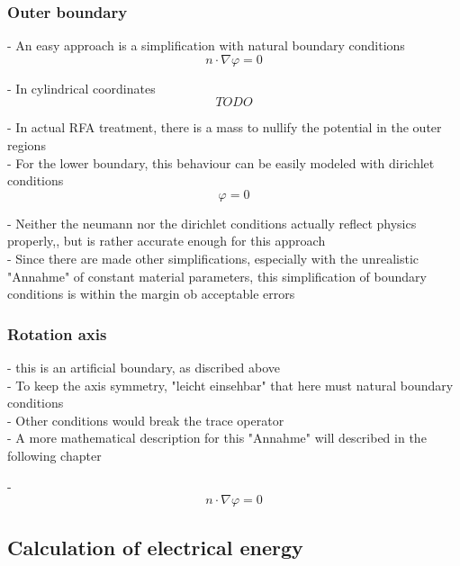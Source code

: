 \documentclass[parskip=half, titlepage=yes, 12pt, BCOR=12mm, DIV=calc]{scrartcl}
\begin{document}
\subsubsection{Outer boundary}

- An easy approach is a simplification with natural boundary conditions \\

\begin{equation}
    n \cdot \nabla \varphi = 0
\end{equation}

- In cylindrical coordinates
\begin{equation}
    TODO
\end{equation}

- In actual RFA treatment, there is a mass to nullify the potential in the outer regions \\
- For the lower boundary, this behaviour can be easily modeled with dirichlet conditions \\
\begin{equation}
    \varphi = 0
\end{equation}

- Neither the neumann nor the dirichlet conditions actually reflect physics properly,, but is rather accurate enough for this approach \\
- Since there are made other simplifications, especially with the unrealistic "Annahme" of constant material parameters, this simplification of boundary conditions is within the margin ob acceptable errors


\subsubsection{Rotation axis}

- this is an artificial boundary, as discribed above \\
- To keep the axis symmetry, "leicht einsehbar" that here must natural boundary conditions \\
- Other conditions would break the trace operator \\
- A more mathematical description for this "Annahme" will described in the following chapter

- \begin{equation}
    n \cdot \nabla \varphi = 0
\end{equation}



\subsection{Calculation of electrical energy}
\end{document}
